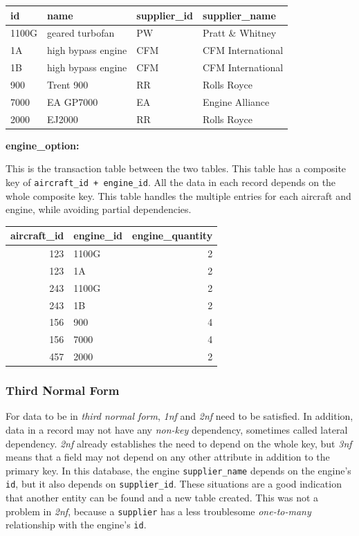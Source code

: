 \documentclass[10pt]{article}
\begin{document}
\begin{center}
\begin{tabular}{llll}
\hline
id & name & supplier\_id & supplier\_name\\
\hline
1100G & geared turbofan & PW & Pratt \& Whitney\\
1A & high bypass engine & CFM & CFM International\\
1B & high bypass engine & CFM & CFM International\\
900 & Trent 900 & RR & Rolls Royce\\
7000 & EA GP7000 & EA & Engine Alliance\\
2000 & EJ2000 & RR & Rolls Royce\\
\hline
\end{tabular}
\end{center}

\textbf{engine\_option:}

This is the transaction table between the two tables. This table has a composite key of \texttt{aircraft\_id + engine\_id}. All the data in each record depends on the whole composite key. This table handles the multiple entries for each aircraft and engine, while avoiding partial dependencies.

\begin{center}
\begin{tabular}{rlr}
\hline
aircraft\_id & engine\_id & engine\_quantity\\
\hline
123 & 1100G & 2\\
123 & 1A & 2\\
243 & 1100G & 2\\
243 & 1B & 2\\
156 & 900 & 4\\
156 & 7000 & 4\\
457 & 2000 & 2\\
\hline
\end{tabular}
\end{center}

\subsubsection{Third Normal Form}
\label{sec:orgbdd2324}

For data to be in \emph{third normal form}, \emph{1nf} and \emph{2nf} need to be satisfied. In addition, data in a record may not have any \emph{non-key} dependency, sometimes called lateral dependency. \emph{2nf} already establishes the need to depend on the whole key, but \emph{3nf} means that a field may not depend on any other attribute in addition to the primary key. In this database, the engine \texttt{supplier\_name} depends on the engine's \texttt{id}, but it also depends on \texttt{supplier\_id}. These situations are a good indication that another entity can be found and a new table created. This was not a problem in \emph{2nf}, because a \texttt{supplier} has a less troublesome \emph{one-to-many} relationship with the engine's \texttt{id}.
\end{document}
